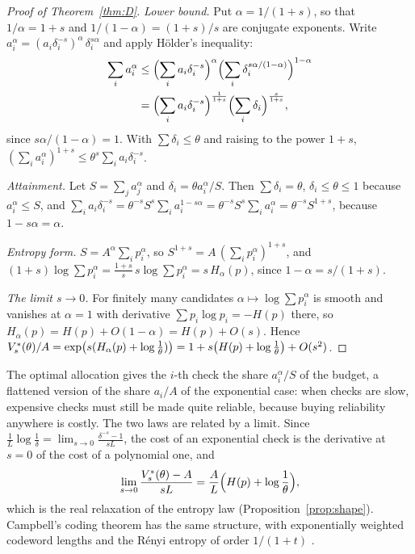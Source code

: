 \begin{proof}[Proof of Theorem~\ref{thm:D}]
\emph{Lower bound.} Put $\alpha=1/(1+s)$, so that $1/\alpha=1+s$ and $1/(1-\alpha)=(1+s)/s$ are conjugate exponents. Write $a_{i}^{\alpha}=(a_{i}\delta_{i}^{-s})^{\alpha}\,\delta_{i}^{s\alpha}$ and apply H\"older's inequality:
\[
\begin{aligned}
\sum_{i}a_{i}^{\alpha}&\le\Bigl(\sum_{i}a_{i}\delta_{i}^{-s}\Bigr)^{\alpha}\Bigl(\sum_{i}\delta_{i}^{s\alpha/(1-\alpha)}\Bigr)^{1-\alpha}\\
&=\Bigl(\sum_{i}a_{i}\delta_{i}^{-s}\Bigr)^{\frac1{1+s}}\Bigl(\sum_{i}\delta_{i}\Bigr)^{\frac s{1+s}},
\end{aligned}
\]
since $s\alpha/(1-\alpha)=1$. With $\sum\delta_{i}\le\theta$ and raising to the power $1+s$, $(\sum_{i}a_{i}^{\alpha})^{1+s}\le\theta^{s}\sum_{i}a_{i}\delta_{i}^{-s}$.

\emph{Attainment.} Let $S=\sum_{j}a_{j}^{\alpha}$ and $\delta_{i}=\theta a_{i}^{\alpha}/S$. Then $\sum\delta_{i}=\theta$, $\delta_{i}\le\theta\le1$ because $a_{i}^{\alpha}\le S$, and $\sum_{i}a_{i}\delta_{i}^{-s}=\theta^{-s}S^{s}\sum_{i}a_{i}^{1-s\alpha}=\theta^{-s}S^{s}\sum_{i}a_{i}^{\alpha}=\theta^{-s}S^{1+s}$, because $1-s\alpha=\alpha$.

\emph{Entropy form.} $S=A^{\alpha}\sum_{i}p_{i}^{\alpha}$, so $S^{1+s}=A\,(\sum_{i}p_{i}^{\alpha})^{1+s}$, and $(1+s)\log\sum p_{i}^{\alpha}=\frac{1+s}{s}\,s\log\sum p_{i}^{\alpha}=s\,H_{\alpha}(p)$, since $1-\alpha=s/(1+s)$.

\emph{The limit $s\to0$.} For finitely many candidates $\alpha\mapsto\log\sum p_{i}^{\alpha}$ is smooth and vanishes at $\alpha=1$ with derivative $\sum p_{i}\log p_{i}=-H(p)$ there, so $H_{\alpha}(p)=H(p)+O(1-\alpha)=H(p)+O(s)$. Hence $V^{*}_{s}(\theta)/A=\exp\bigl(s(H_{\alpha}(p)+\log\frac1\theta)\bigr)=1+s\bigl(H(p)+\log\frac1\theta\bigr)+O(s^{2})$.
\end{proof}

The optimal allocation gives the $i$-th check the share $a_{i}^{\alpha}/S$ of the budget, a flattened version of the share $a_{i}/A$ of the exponential case: when checks are slow, expensive checks must still be made quite reliable, because buying reliability anywhere is costly. The two laws are related by a limit. Since $\frac1L\log\frac1\delta=\lim_{s\to0}\frac{\delta^{-s}-1}{sL}$, the cost of an exponential check is the derivative at $s=0$ of the cost of a polynomial one, and
\[
\lim_{s\to0}\frac{V^{*}_{s}(\theta)-A}{sL}=\frac AL\Bigl(H(p)+\log\frac1\theta\Bigr),
\]
which is the real relaxation of the entropy law (Proposition~\ref{prop:shape}). Campbell's coding theorem has the same structure, with exponentially weighted codeword lengths and the R\'enyi entropy of order $1/(1+t)$ \cite{Cam65}.

